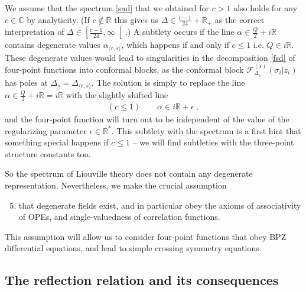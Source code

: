 \documentclass[12pt, a4paper, notitlepage, twoside]{report}
\numberwithin{equation}{section}
\theoremstyle{break}
\begin{document}
We assume that the spectrum \eqref{sad} that we obtained for $c>1$ also holds for any $c\in\mathbb{C}$ by analyticity. 
(If $c\notin\mathbb{R}$  this gives us $\Delta \in \frac{c-1}{24} + \mathbb{R}_+$ as the correct interpretation of $\Delta \in \left[\frac{c-1}{24},\infty\right[$.)
A subtlety occurs if the line $\alpha \in \frac{Q}{2}+i\mathbb{R}$ contains degenerate values $\alpha_{\langle r, s\rangle}$, which happens if and only if $c\leq 1$ i.e. $Q\in i\mathbb{R}$. 
These degenerate values would lead to singularities in the decomposition \eqref{fsd} of four-point functions into conformal blocks, as the conformal block $\mathcal{F}_{\Delta_s}^{(s)}(\sigma_i|z_i)$ has poles at $\Delta_s = \Delta_{\langle r, s\rangle}$. 
The solution is simply to replace the line $\alpha \in \frac{Q}{2} + i\mathbb{R} = i\mathbb{R}$ with the slightly shifted line 
\begin{align}
 (c\leq 1) \qquad \alpha \in i\mathbb{R} + \epsilon\ ,
\end{align}
and the four-point function will turn out to be independent of the value of the regularizing parameter $\epsilon \in \mathbb{R}^*$. 
This subtlety with the spectrum is a first hint that something special happens if $c\leq 1$ -- we will find subtleties with the three-point structure constants too. 

So the spectrum of Liouville theory does not contain any degenerate representation. 
Nevertheless, we make the crucial assumption 
\begin{enumerate}
\setcounter{enumi}{4}
 \item that degenerate fields exist, and in particular obey the axioms of associativity of OPEs, and single-valuedness of correlation functions.
\end{enumerate}
This assumption will allow us to consider four-point functions that obey BPZ differential equations, and lead to simple crossing symmetry equations.

\subsection{The reflection relation and its consequences}
\end{document}
